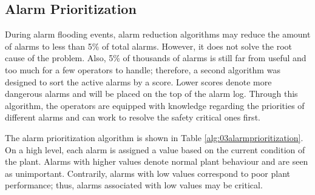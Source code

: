 \subsection{Alarm Prioritization}
During alarm flooding events, alarm reduction algorithms may reduce the amount of alarms to less than 5\% of total alarms.  However, it does not solve the root cause of the problem.  Also, 5\% of thousands of alarms is still far from useful and too much for a few operators to handle; therefore, a second algorithm was designed to sort the active alarms by a score.  Lower scores denote more dangerous alarms and will be placed on the top of the alarm log. Through this algorithm, the operators are equipped with knowledge regarding the priorities of different alarms and can work to resolve the safety critical ones first. 

The alarm prioritization algorithm is shown in Table \ref{alg:03alarmprioritization}.  On a high level, each alarm is assigned a value based on the current condition of the plant.  Alarms with higher values denote normal plant behaviour and are seen as unimportant.  Contrarily, alarms with low values correspond to poor plant performance; thus, alarms associated with low values may be critical.

